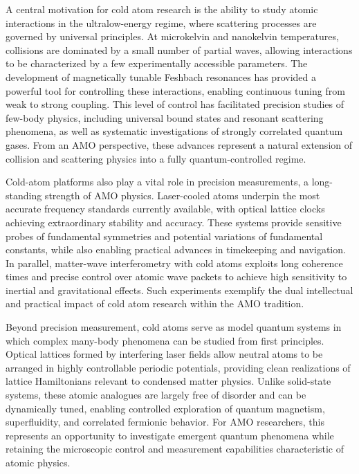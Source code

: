 \medskip
\noindent
A central motivation for cold atom research is the ability to study atomic interactions in the ultralow-energy regime, where scattering processes are governed by universal principles. At microkelvin and nanokelvin temperatures, collisions are dominated by a small number of partial waves, allowing interactions to be characterized by a few experimentally accessible parameters. The development of magnetically tunable Feshbach resonances has provided a powerful tool for controlling these interactions, enabling continuous tuning from weak to strong coupling. This level of control has facilitated precision studies of few-body physics, including universal bound states and resonant scattering phenomena, as well as systematic investigations of strongly correlated quantum gases. From an AMO perspective, these advances represent a natural extension of collision and scattering physics into a fully quantum-controlled regime.

\medskip
\noindent
Cold-atom platforms also play a vital role in precision measurements, a long-standing strength of AMO physics. Laser-cooled atoms underpin the most accurate frequency standards currently available, with optical lattice clocks achieving extraordinary stability and accuracy. These systems provide sensitive probes of fundamental symmetries and potential variations of fundamental constants, while also enabling practical advances in timekeeping and navigation. In parallel, matter-wave interferometry with cold atoms exploits long coherence times and precise control over atomic wave packets to achieve high sensitivity to inertial and gravitational effects. Such experiments exemplify the dual intellectual and practical impact of cold atom research within the AMO tradition.

\medskip
\noindent
Beyond precision measurement, cold atoms serve as model quantum systems in which complex many-body phenomena can be studied from first principles. Optical lattices formed by interfering laser fields allow neutral atoms to be arranged in highly controllable periodic potentials, providing clean realizations of lattice Hamiltonians relevant to condensed matter physics. Unlike solid-state systems, these atomic analogues are largely free of disorder and can be dynamically tuned, enabling controlled exploration of quantum magnetism, superfluidity, and correlated fermionic behavior. For AMO researchers, this represents an opportunity to investigate emergent quantum phenomena while retaining the microscopic control and measurement capabilities characteristic of atomic physics.

